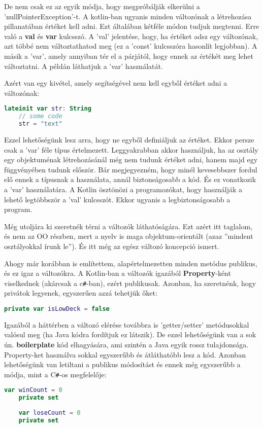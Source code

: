 De nem csak ez az egyik módja, hogy megpróbálják elkerülni a 'nullPointerException'-t. A kotlin-ban ugyanis minden változónak a létrehozása pillanatában értéket kell adni. Ezt általában kétféle módon tudjuk megtenni. Erre való a \textbf{val} és \textbf{var} kulcsszó. A 'val' jelentése, hogy, ha értéket adsz egy változónak, azt többé nem változtathatod meg (ez a 'const' kulcsszóra hasonlít legjobban). A másik a 'var', amely annyiban tér el a párjától, hogy ennek az értékét meg lehet változtatni. A példán láthatjuk a 'var' használatát.

Azért van egy kivétel, amely segítségével nem kell egyből értéket adni a változónak:
\scriptsize
\begin{lstlisting}[language = Kotlin]
	lateinit var str: String
	// some code
	str = "text"
\end{lstlisting}
\normalsize
Ezzel lehetőségünk lesz arra, hogy ne egyből definiáljuk az értéket. Ekkor persze csak a 'var' féle típus értelmezett. Leggyakrabban akkor használjuk, ha az osztály egy objektuménak létrehozásánál még nem tudunk értéket adni, hanem majd egy függvényében tudunk először. Bár megjegyezném, hogy minél kevesebbszer fordul elő ennek a típusnak a használata, annál biztonságosabb a kód. És ez vonatkozik a 'var' használatára. A Kotlin ösztönözi a programozókat, hogy használják a lehető legtöbbször a 'val' kulcsszót. Ekkor ugyanis a legbiztonságosabb a program.

Még utoljára ki szeretnék térni a változók láthatóságára. Ezt azért itt taglalom, és nem az OO részben, mert a nyelv is maga objektum-orientált (azaz ''mindent osztályokkal írunk le''). És itt még az egész változó koncepció ismert. 

Ahogy már korábban is említettem, alapértelmezetten minden metódus publikus, és ez igaz a változókra. A Kotlin-ban  a változók igazából \textbf{Property}-ként viselkednek (akárcsak a c\verb|#|-ban), ezért publikusak. Azonban, ha szeretnénk, hogy privátok legyenek, egyszerűen azzá tehetjük őket:
\scriptsize
\begin{lstlisting}[language = Kotlin]
	private var isLowDeck = false
\end{lstlisting}
\normalsize
\newpage
Igazából a háttérben a változó elérése továbbra is 'getter/setter' metódusokkal valósul meg (ha Java kódra fordítjuk ez látszik). De ezzel lehetőségünk van a sok ún. \textbf{boilerplate} kód elhagyására, ami szintén a Java egyik rossz tulajdonsága. Property-ket használva sokkal egyszerűbb és átláthatóbb lesz a kód. Azonban lehetőségünk van letiltani a publikus módosítást és ennek még egyszerűbb a módja, mint a C\verb|#|-os megfelelője:
\scriptsize
\begin{lstlisting}[language = Kotlin]
	var winCount = 0
	private set
	
	var loseCount = 0
	private set
\end{lstlisting}
\normalsize

